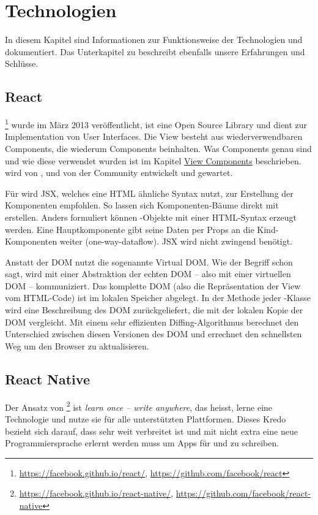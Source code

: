 \chapter{Technologien}
\label{pd-technologien}
In diesem Kapitel sind Informationen zur Funktionsweise der Technologien  und  dokumentiert. 
Das Unterkapitel zu  beschreibt ebenfalls unsere Erfahrungen und Schlüsse.


\section{React} 
\footnote{\url{https://facebook.github.io/react/}, \url{https://github.com/facebook/react}} wurde im März 2013 veröffentlicht\cite{react-release}, ist eine Open Source  \gls{Library} und dient zur Implementation von User Interfaces. 
Die View besteht aus wiederverwendbaren Components, die wiederum Components beinhalten. 
Was Components genau sind und wie diese verwendet wurden ist im Kapitel \hyperref[pd-implementation-components]{View Components} beschrieben. 
 wird von ,  und von der Community entwickelt und gewartet.\cite{react}

Für  wird \gls{JSX}, welches eine HTML ähnliche Syntax nutzt, zur Erstellung der Komponenten empfohlen. 
So lassen sich Komponenten-Bäume direkt mit  erstellen. 
Anders formuliert können -Objekte mit einer HTML-Syntax erzeugt werden. 
Eine Hauptkomponente gibt seine Daten per Props an die Kind-Komponenten weiter (one-way-dataflow).\cite{react-data-flow}
JSX wird nicht zwingend benötigt.\cite{jsx-syntax}

Anstatt der \gls{DOM} nutzt  die sogenannte \gls{Virtual DOM}.
Wie der Begriff schon sagt, wird mit einer Abstraktion der echten DOM -- also mit einer virtuellen DOM -- kommuniziert.
Das komplette DOM (also die Repräsentation der View vom HTML-Code) ist im lokalen Speicher abgelegt.\cite{virtual-dom}
In der  Methode jeder -Klasse wird eine Beschreibung des DOM zurückgeliefert, die  mit der lokalen Kopie der DOM vergleicht.
Mit einem sehr effizienten Diffing-Algorithmus berechnet  den Unterschied zwischen diesen  Versionen des DOM und errechnet den schnellsten Weg um den Browser zu aktualisieren.\cite{react-virtual-dom}


\section{React Native}
Der Ansatz von \footnote{\url{https://facebook.github.io/react-native/}, \url{https://github.com/facebook/react-native}} ist \textit{learn once -- write anywhere}, das heisst, lerne eine Technologie und nutze sie für alle unterstützten Plattformen.\cite{react-native}
Dieses Kredo bezieht sich darauf, dass  sehr weit verbreitet ist und mit  nicht extra eine neue Programmiersprache erlernt werden muss um Apps für  und  zu schreiben.


